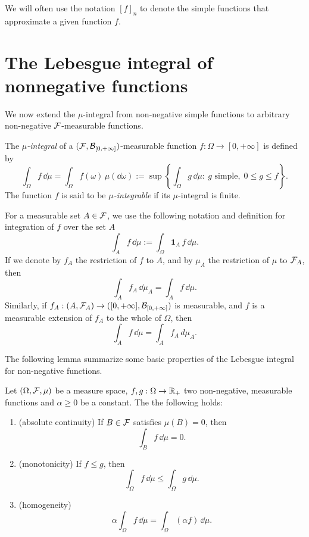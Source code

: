 We will often use the notation $[f]_n$ to denote the simple functions that approximate a given function $f$.

\section{The Lebesgue integral of nonnegative functions}

We now extend the $\mu$-integral from non-negative simple functions to arbitrary non-negative $\mathcal F$-measurable functions.

\begin{definition}\label{def:lebesgue_non_negative}
	The \emph{$\mu$-integral} of a $(\mathcal F,\mathcal B_{[0,+\infty]})$-measurable function $f:\Omega\to[0,+\infty]$ is defined by
\[
	\int_\Omega f\, \dd \mu = \int_\Omega f(\omega)\,\mu(\dd\omega) := \sup\left\{ \int_\Omega g\, \dd \mu : \ g \text{ simple},\; 0 \leq g  \leq f \right\}.
\]
The function $f$ is said to be \emph{$\mu$-integrable} if its $\mu$-integral is finite.
\end{definition}

For a measurable set $A \in \mathcal F$, we use the following notation and definition for integration of $f$ over the set $A$
\[
	\int_A f\, \dd \mu := \int_\Omega \mathbf{1}_A\, f\, \dd \mu.
\]
If we denote by $f_A$ the restriction of $f$ to $A$, and by $\mu_A$ the restriction of $\mu$ to $\mathcal F_A$, then 
\[
\int_A f_A\,\dd \mu_A = \int_A f\, \dd \mu.
\]
Similarly, if $f_A:(A, \mathcal F_A) \to ([0,+\infty],\mathcal B_{[0,+\infty]})$ is measurable, and $f$ is a measurable extension of $f_A$ to the whole of $\Omega$, then
\[
	\int_A f\,\dd \mu = \int_A f_A\, d \mu_A.
\]

The following lemma summarize some basic properties of the Lebesgue integral for non-negative functions.

\begin{lemma}
	\label{prop:properties-integral-nonneg}
	Let $(\Omega, \mathcal F, \mu)$ be a measure space, $f, g : \Omega \to \mathbb R_+$ two non-negative, measurable functions and $\alpha \geq 0$ be a constant. The the following holds:
	\begin{enumerate}
		\item (absolute continuity) If $B \in \mathcal F$ satisfies $\mu(B) = 0$, then
		\[
		\int_{B} f\, \dd \mu = 0. 
		\]
		\item (monotonicity) If $f \leq g$, then
		\[
		\int_\Omega f\, \dd \mu \leq \int_\Omega g\, \dd \mu.
		\]
		\item (homogeneity)
		\[
			\alpha \int_\Omega f\, \dd \mu = \int_\Omega (\alpha f )\,\dd \mu.
		\]
	\end{enumerate}
\end{lemma}

